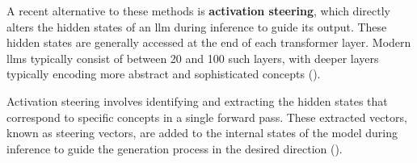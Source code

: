 
A recent alternative to these methods is \textbf{activation steering}, which directly alters the hidden states of an \acs{llm} during inference to guide its output. These hidden states are generally accessed at the end of each transformer layer. Modern \acp{llm} typically consist of between \num{20} and \num{100} such layers, with deeper layers typically encoding more abstract and sophisticated concepts (\cite{bogdanEmergentEffectsScaling2025}).

Activation steering involves identifying and extracting the hidden states that correspond to specific concepts in a single forward pass. These extracted vectors, known as steering vectors, are added to the internal states of the model during inference to guide the generation process in the desired direction (\cite{konenStyleVectorsSteering2024,turnerActivationAdditionSteering2024,subramaniExtractingLatentSteering2022}).
